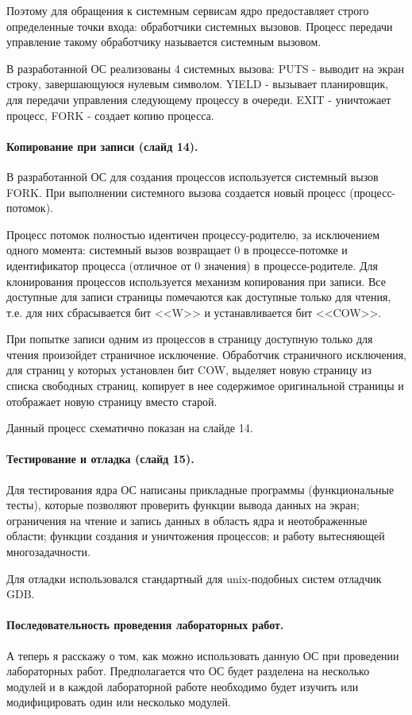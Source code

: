 \documentclass[12pt]{article}
\begin{document}
Поэтому для обращения к системным сервисам ядро предоставляет строго определенные точки входа:
обработчики системных вызовов. Процесс передачи управление такому обработчику называется системным вызовом.

В разработанной ОС реализованы 4 системных вызова: PUTS - выводит на экран строку, завершающуюся нулевым
символом. YIELD - вызывает планировщик, для передачи управления следующему процессу в очереди. EXIT -
уничтожает процесс, FORK - создает копию процесса.

\paragraph{Копирование при записи (слайд 14).}
В разработанной ОС для создания процессов используется системный вызов FORK. При выполнении системного
вызова создается новый процесс (процесс-потомок).

Процесс потомок полностью идентичен процессу-родителю, за исключением одного момента: системный вызов
возвращает 0 в процессе-потомке и идентификатор процесса (отличное от 0 значения) в процессе-родителе. Для
клонирования процессов используется механизм копирования при записи. Все доступные для записи
страницы помечаются как доступные только для чтения, т.е. для них сбрасывается бит <<W>> и устанавливается бит <<COW>>.

При попытке записи одним из процессов в страницу доступную только для чтения произойдет страничное исключение.
Обработчик страничного исключения, для страниц у которых установлен бит COW, выделяет новую страницу из списка
свободных страниц, копирует в нее содержимое оригинальной страницы и отображает новую страницу вместо старой.

Данный процесс схематично показан на слайде 14.

\paragraph{Тестирование и отладка (слайд 15).}
Для тестирования ядра ОС написаны прикладные программы (функциональные тесты), которые позволяют
проверить функции вывода данных на экран; ограничения на чтение и запись данных в область ядра
и неотображенные области; функции создания и уничтожения процессов; и работу вытесняющей многозадачности.

Для отладки использовался стандартный для unix-подобных систем отладчик GDB.

\paragraph{Последовательность проведения лабораторных работ.}
А теперь я расскажу о том, как можно использовать данную ОС при проведении лабораторных работ.
Предполагается что ОС будет разделена на несколько модулей и в каждой лабораторной работе необходимо
будет изучить или модифицировать один или несколько модулей.
\end{document}
